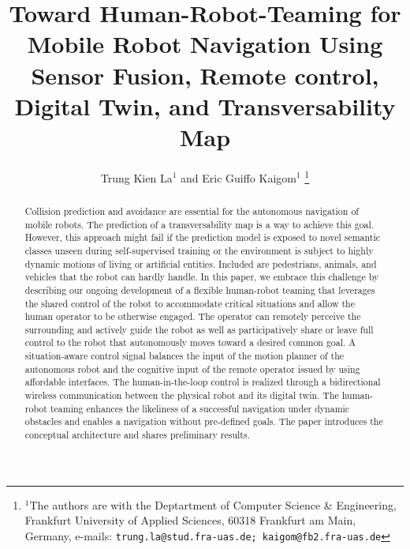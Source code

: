 \documentclass[letterpaper, 10 pt, conference]{ieeeconf}  %
\title{\LARGE \bf
Toward Human-Robot-Teaming for Mobile Robot Navigation Using
Sensor Fusion, Remote control, Digital Twin, and  Transversability Map
}
\author{Trung Kien La$^{1}$ and Eric Guiffo Kaigom$^{1}$%
\thanks{$^{1}$The authors are with the Deptartment of Computer Science \& Engineering,
        Frankfurt University of Applied Sciences, 60318 Frankfurt am Main, Germany, e-mails:
        {\tt\small trung.la@stud.fra-uas.de; kaigom@fb2.fra-uas.de}}%
}
\begin{document}
\maketitle
\thispagestyle{empty}
\pagestyle{empty}


\begin{abstract}

Collision prediction and avoidance are essential for the autonomous navigation of mobile robots. The prediction of a transversability map is a way to achieve this goal. However, this approach might fail if the prediction model is exposed to novel semantic classes unseen during self-supervised training or  the environment is subject to  highly dynamic motions of living or artificial entities. Included are pedestrians, animals, and  vehicles that the robot can hardly handle. In this paper, we  embrace this challenge by describing our ongoing development of a flexible human-robot teaming that leverages the shared control of the robot to accommodate critical situations and allow the human operator to be otherwise engaged. The operator can remotely perceive the surrounding and actively guide the robot as well as participatively share or leave full control to the robot that autonomously moves toward a desired common goal. A situation-aware control signal balances the input of the motion planner of the autonomous robot and the cognitive input of the  remote  operator issued by using affordable  interfaces. %
The human-in-the-loop control is realized through a bidirectional wireless communication between the physical robot and its  digital twin.  The human-robot teaming enhances the likeliness of a successful navigation under dynamic obstacles and enables a navigation without pre-defined goals. The paper introduces the conceptual architecture and shares preliminary results.

\end{abstract}


\end{document}
